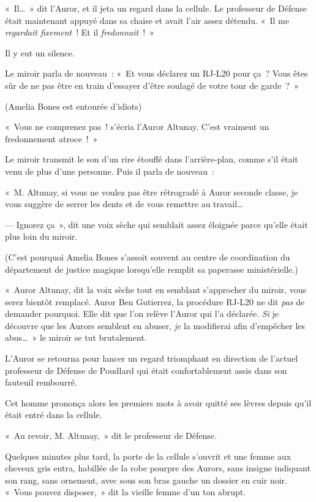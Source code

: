«~Il…~» dit l'Auror, et il jeta un regard dans la cellule.
Le professeur de Défense était maintenant appuyé dans sa chaise et avait l'air assez détendu.
«~Il me \emph{regardait fixement}~!
Et il \emph{fredonnait}~!~»

Il y eut un silence.

Le miroir parla de nouveau~: «~Et vous déclarez un RJ-L20 pour ça~?
Vous êtes sûr de ne pas être en train d'essayer d'être soulagé de votre tour de garde~?~»

(Amelia Bones est entourée d'idiots)

«~Vous ne comprenez pas~! s'écria l'Auror Altunay.
C'est vraiment un fredonnement atroce~!~»

Le miroir transmit le son d'un rire étouffé dans l'arrière-plan, comme s'il était venu de plus d'une personne.
Puis il parla de nouveau~:

«~M. Altunay, si vous ne voulez pas être rétrogradé à Auror seconde classe, je vous suggère de serrer les dents et de vous remettre au travail…

--- Ignorez ça~», dit une voix sèche qui semblait assez éloignée parce qu'elle était plus loin du miroir.

(C'est pourquoi Amelia Bones s'assoit souvent au centre de coordination du département de justice magique lorsqu'elle remplit sa paperasse ministérielle.)

«~Auror Altunay, dit la voix sèche tout en semblant s'approcher du miroir, vous serez bientôt remplacé.
Auror Ben Gutierrez, la procédure RJ-L20 ne dit \emph{pas} de demander pourquoi.
Elle dit que l'on relève l'Auror qui l'a déclarée.
\emph{Si} je découvre que les Aurors semblent en abuser, \emph{je} la modifierai afin d'empêcher les abus…~»
le miroir se tut brutalement.

L'Auror se retourna pour lancer un regard triomphant en direction de l'actuel professeur de Défense de Poudlard qui était confortablement assis dans son fauteuil rembourré.

Cet homme prononça alors les premiers mots à avoir quitté ses lèvres depuis qu'il était entré dans la cellule.

«~Au revoir, M. Altunay,~» dit le professeur de Défense.

Quelques minutes plus tard, la porte de la cellule s'ouvrit et une femme aux cheveux gris entra, habillée de la robe pourpre des Aurors, sans insigne indiquant son rang, sans ornement, avec sous son bras gauche un dossier en cuir noir.
«~Vous pouvez disposer,~» dit la vieille femme d'un ton abrupt.

